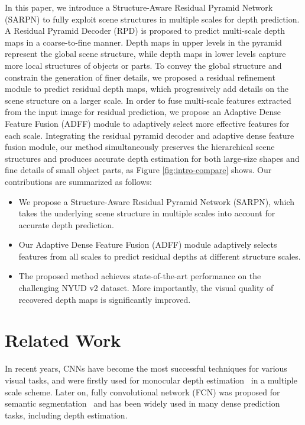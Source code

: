 \documentclass{article}
\begin{document}
In this paper, we introduce a Structure-Aware Residual Pyramid Network (SARPN) to fully exploit scene structures in multiple scales for depth prediction. A Residual Pyramid Decoder (RPD) is proposed to predict multi-scale depth maps in a coarse-to-fine manner.
Depth maps in upper levels in the pyramid represent the global scene structure, while depth maps in lower levels capture more local structures of objects or parts. To convey the global structure and constrain the generation of finer details, we proposed a residual refinement module to predict residual depth maps, which progressively add details on the scene structure on a larger scale. 
In order to fuse multi-scale features extracted from the input image for residual prediction, we propose an Adaptive Dense Feature Fusion (ADFF) module to adaptively select more effective features for each scale. 
Integrating the residual pyramid decoder and adaptive dense feature fusion module, our method 
simultaneously preserves the hierarchical scene structures and produces accurate depth estimation for both large-size shapes and fine details of small object parts, as Figure \ref{fig:intro-compare} shows.
Our contributions are summarized as follows:
\begin{itemize}
	\item We propose a Structure-Aware Residual Pyramid Network (SARPN), which takes the underlying scene structure in multiple scales into account for accurate depth prediction.
	\item Our Adaptive Dense Feature Fusion (ADFF) module adaptively selects features from all scales to predict residual depths at different structure scales.
	\item The proposed method achieves state-of-the-art performance on the challenging NYUD v2 dataset. More importantly, the visual quality of recovered depth maps is significantly improved.
\end{itemize} 	\section{Related Work}
In recent years, CNNs have become the most successful techniques for various visual tasks, and were firstly used for monocular depth estimation~\cite{eigen2014prediction} in a multiple scale scheme.
Later on, fully convolutional network (FCN) was proposed for semantic segmentation~\cite{long2015fully} and has been widely used in many dense prediction tasks, including depth estimation. 
\end{document}

